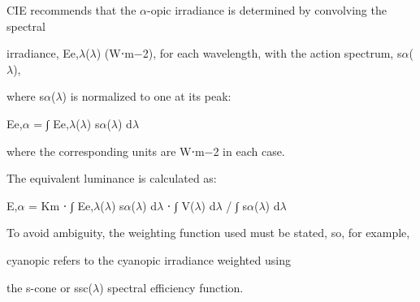 \documentclass[letterpaper,10pt,english]{sphinxmanual}
\begin{document}
\begin{DUlineblock}{0em}
\item[] CIE recommends that the \(\alpha\)-opic irradiance is determined by convolving the spectral
\item[] irradiance, Ee,\(\lambda\)(\(\lambda\)) (W⋅m−2), for each wavelength, with the action spectrum, s\(\alpha\)(\(\lambda\)), 
\item[] where s\(\alpha\)(\(\lambda\)) is normalized to one at its peak:
\item[] 
\item[]
\begin{DUlineblock}{\DUlineblockindent}
\item[] Ee,\(\alpha\) = ∫ Ee,\(\lambda\)(\(\lambda\)) s\(\alpha\)(\(\lambda\)) d\(\lambda\) 
\item[] 
\end{DUlineblock}
\item[] where the corresponding units are W⋅m−2 in each case. 
\item[] 
\item[] The equivalent luminance is calculated as:
\item[] 
\item[]
\begin{DUlineblock}{\DUlineblockindent}
\item[] E,\(\alpha\) = Km ⋅ ∫ Ee,\(\lambda\)(\(\lambda\)) s\(\alpha\)(\(\lambda\)) d\(\lambda\) ⋅ ∫ V(\(\lambda\)) d\(\lambda\) / ∫ s\(\alpha\)(\(\lambda\)) d\(\lambda\)
\item[] 
\end{DUlineblock}
\item[] To avoid ambiguity, the weighting function used must be stated, so, for example, 
\item[] cyanopic refers to the cyanopic irradiance weighted using 
\item[] the s-cone or ssc(\(\lambda\)) spectral efficiency function.
\end{DUlineblock}
\end{document}
